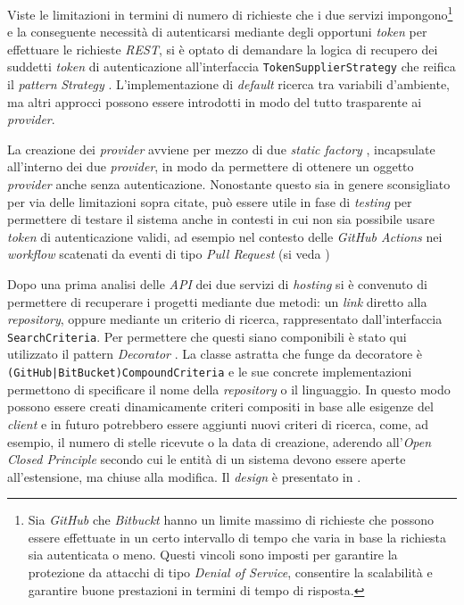Viste le limitazioni in termini di numero di richieste che i due servizi impongono\footnote{Sia \textit{GitHub} che \textit{Bitbuckt} hanno un limite massimo di richieste che possono essere effettuate in un certo intervallo di tempo che varia in base la richiesta sia autenticata o meno. Questi vincoli sono imposti per garantire la protezione da attacchi di tipo \textit{Denial of Service}, consentire la scalabilità e garantire buone prestazioni in termini di tempo di risposta.} e la conseguente necessità di autenticarsi mediante degli opportuni \textit{token} per effettuare le richieste \textit{REST}, si è optato di demandare la logica di recupero dei suddetti \textit{token} di autenticazione all'interfaccia \texttt{TokenSupplierStrategy} che reifica il \textit{pattern} \textit{Strategy} \cite{gof}.
%
L'implementazione di \textit{default} ricerca tra variabili d'ambiente, ma altri approcci possono essere introdotti in modo del tutto trasparente ai \textit{provider}.

La creazione dei \textit{provider} avviene per mezzo di due \textit{static factory} \cite{effective-java}, incapsulate all'interno dei due \textit{provider}, in modo da permettere di ottenere un oggetto \textit{provider} anche senza autenticazione.
%
Nonostante questo sia in genere sconsigliato per via delle limitazioni sopra citate, può essere utile in fase di \textit{testing} per permettere di testare il sistema anche in contesti in cui non sia possibile usare \textit{token} di autenticazione validi, ad esempio nel contesto delle \textit{GitHub Actions} nei \textit{workflow} scatenati da eventi di tipo \textit{Pull Request} (si veda )

Dopo una prima analisi delle \textit{API} dei due servizi di \textit{hosting} si è convenuto di permettere di recuperare i progetti mediante due metodi: un \textit{link} diretto alla \textit{repository}, oppure mediante un criterio di ricerca, rappresentato dall'interfaccia \texttt{SearchCriteria}.
%
Per permettere che questi siano componibili è stato qui utilizzato il pattern \textit{Decorator} \cite{gof}.
%
La classe astratta che funge da decoratore è \texttt{(GitHub|BitBucket)CompoundCriteria} e le sue concrete implementazioni permettono di specificare il nome della \textit{repository} o il linguaggio.
%
In questo modo possono essere creati dinamicamente criteri compositi in base alle esigenze del \textit{client} e in futuro potrebbero essere aggiunti nuovi criteri di ricerca, come, ad esempio, il numero di stelle ricevute o la data di creazione, aderendo all'\textit{Open Closed Principle} secondo cui le entità di un sistema devono essere aperte all'estensione, ma chiuse alla modifica.
%
Il \textit{design} è presentato in .


